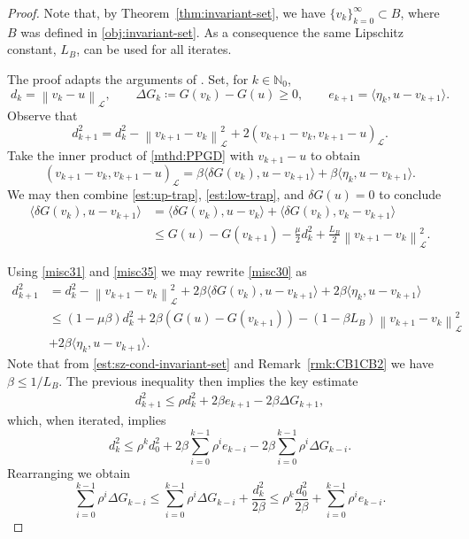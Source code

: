 \documentclass{amsart}
\newcommand{\polN}{\mathbb N}
\newcommand{\vkp}{{v_{k+1}}}
\newcommand{\vk}{{v_{k}}}
\newcommand{\etak}{{\eta_{k}}}
\newcommand{\dG}{{\delta G}}
\newcommand{\LL}{\mathcal{L}}
\newcommand{\norm}[2]{\left\| #1 \right\| _{#2}}
\newcommand{\pairing}[2]{\bigl\langle #1 , #2 \bigr\rangle}
\newcommand{\iprd}[2]{\left( #1 , #2 \right)}
\newcommand{\iprdL}[2]{\left( #1 , #2 \right)_\LL}
\newcommand{\s}{{\beta}}	%
\theoremstyle{definition}
\begin{document}
\begin{proof}
	Note that, by Theorem~\ref{thm:invariant-set}, we have $\{v_k\}_{k=0}^\infty \subset B$, where $B$ was defined in \eqref{obj:invariant-set}. As a consequence the same Lipschitz constant, $L_B$, can be used for all iterates.
	
	The proof adapts the arguments of \cite{devolder2013exactness}. Set, for $k \in \polN_0$,
	\[
	  d_k=\norm{v_k - u}{\LL}, \qquad \Delta G_k\coloneqq G(v_k)-G(u)\ge 0, \qquad e_{k+1}=\pairing{\etak}{u - \vkp}.
	\]
	Observe that
	\begin{equation}\label{misc30}
		d_{k+1}^2 =  d_{k}^2 -\norm{\vkp - \vk}{\LL}^2 +2\iprd{\vkp -\vk}{\vkp - u}_\LL.
	\end{equation}
	Take the inner product of \eqref{mthd:PPGD} with $\vkp - u$ to obtain
	\begin{equation}\label{misc31}
		\iprdL{\vkp - \vk}{\vkp-u}=\s\pairing{\dG(v_k)}{u - \vkp}+\s\pairing{\etak}{u - \vkp}.
	\end{equation}
	We may then combine \eqref{est:up-trap}, \eqref{est:low-trap}, and $\dG(u) = 0$ to conclude
	\begin{equation}\label{misc35}
    \begin{aligned}
      \pairing{\dG(v_k)}{u - \vkp} &= \pairing{\dG(v_k)}{u - \vk} + \pairing{\dG(v_k)}{\vk - \vkp} 
      \\
      & \le G(u) - G(\vkp) - \frac{\mu}{2} d_{k}^2 + \frac{L_B}{2} \norm{\vkp - \vk}{\LL}^2.
		\end{aligned}
	\end{equation}
	
	
	Using \eqref{misc31} and \eqref{misc35} we may rewrite \eqref{misc30} as
	\begin{align*}
		d_{k+1}^2 &=  d_{k}^2 -\norm{\vkp - \vk}{\LL}^2 +2\s\pairing{\dG(v_k)}{u - \vkp}+2\s\pairing{\etak}{u - \vkp}
			\\
		&\le (1-\mu\s) d_{k}^2 +2\s\left(G(u) - G(\vkp)\right) -(1-\s L_B) \norm{\vkp - \vk}{\LL}^2 
		\\
			&+  2\s\pairing{\etak}{u - \vkp}.
	\end{align*}
	Note that from \eqref{est:sz-cond-invariant-set} and Remark~\ref{rmk:CB1CB2} we have $\s \le 1/L_B$. The previous inequality then implies the key estimate
	\begin{align}\label{misc37}
		d_{k+1}^2 \le \rho d_{k}^2 +  2\s e_{k+1} -2\s \Delta G_{k+1} ,
	\end{align}
	which, when iterated, implies
	\[ 
	  d_k^2 \leq \rho^{k} d_{0}^2 +  2\s \sum_{i=0}^{k-1} \rho^i e_{k-i}  - 2\s \sum_{i=0}^{k-1} \rho^i  \Delta G_{k-i}.
	\]
	Rearranging we obtain
	\begin{equation}\label{misc39}
		\sum_{i=0}^{k-1} \rho^i  \Delta G_{k-i} \le \sum_{i=0}^{k-1} \rho^i  \Delta G_{k-i} + \frac{d_{k}^2}{2\s} \le \rho^{k} \frac{d_{0}^2}{2\s} +  \sum_{i=0}^{k-1} \rho^i e_{k-i}.
	\end{equation}
	

\end{proof}
\end{document}
